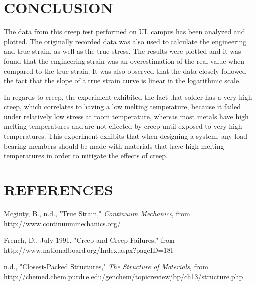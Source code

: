 \documentclass[12pt]{article}
\begin{document}
\newpage


\section*{\fontsize{12}{12}\selectfont CONCLUSION}
The data from this creep test performed on UL campus has been analyzed and plotted. The originally recorded data was also used to calculate the engineering and true strain, as well as the true stress. The results were plotted and it was found that the engineering strain was an overestimation of the real value when compared to the true strain. It was also observed that the data closely followed the fact that the slope of a true strain curve is linear in the logarithmic scale. 
\bigskip

In regards to creep, the experiment exhibited the fact that solder has a very high creep, which correlates to having a low melting temperature, because it failed under relatively low stress at room temperature, whereas most metals have high melting temperatures and are not effected by creep until exposed to very high temperatures. This experiment exhibits that when designing a system, any load-bearing members should be made with materials that have high melting temperatures in order to mitigate the effects of creep.
\bigskip


\section*{\fontsize{12}{12}\selectfont REFERENCES}

\begin{thebibliography}{2}

Mcginty, B., n.d.,
"True Strain," \emph{Continuum Mechanics}, from
http://www.continuummechanics.org/

French, D., July 1991,
"Creep and Creep Failures," from
http://www.nationalboard.org/Index.aspx?pageID=181

n.d., "Closest-Packed Structures," \emph{The Structure of Materials}, from
http://chemed.chem.purdue.edu/genchem/topicreview/bp/ch13/structure.php

\end{thebibliography}


\end{document}
